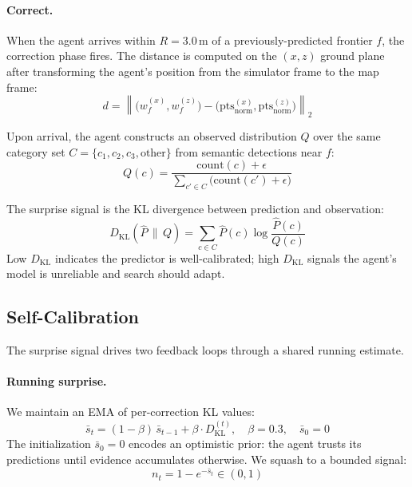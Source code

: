\paragraph{Correct.} When the agent arrives within $R = 3.0$\,m of a previously-predicted frontier $f$, the correction phase fires. The distance is computed on the $(x,z)$ ground plane after transforming the agent's position from the simulator frame to the map frame:
\begin{equation}
    d = \left\lVert \big(w_f^{(x)}, w_f^{(z)}\big) - \big(\mathrm{pts}_{\text{norm}}^{(x)}, \mathrm{pts}_{\text{norm}}^{(z)}\big) \right\rVert_2
    \label{eq:arrival}
\end{equation}

Upon arrival, the agent constructs an observed distribution $Q$ over the same category set $C = \{c_1, c_2, c_3, \text{other}\}$ from semantic detections near $f$:
\begin{equation}
    Q(c) = \frac{\mathrm{count}(c) + \epsilon}{\sum_{c' \in C} \big(\mathrm{count}(c') + \epsilon\big)}
    \label{eq:observed}
\end{equation}

The surprise signal is the KL divergence between prediction and observation:
\begin{equation}
    D_{\mathrm{KL}}(\hat{P} \,\|\, Q) = \sum_{c \in C} \hat{P}(c) \log \frac{\hat{P}(c)}{Q(c)}
    \label{eq:kl}
\end{equation}
Low $D_{\mathrm{KL}}$ indicates the predictor is well-calibrated; high $D_{\mathrm{KL}}$ signals the agent's model is unreliable and search should adapt.

\subsection{Self-Calibration}
\label{sec:calibration}

The surprise signal drives two feedback loops through a shared running estimate.

\paragraph{Running surprise.} We maintain an EMA of per-correction KL values:
\begin{equation}
    \bar{s}_t = (1 - \beta)\,\bar{s}_{t-1} + \beta \cdot D_{\mathrm{KL}}^{(t)}, \quad \beta = 0.3, \quad \bar{s}_0 = 0
    \label{eq:ema}
\end{equation}
The initialization $\bar{s}_0 = 0$ encodes an optimistic prior: the agent trusts its predictions until evidence accumulates otherwise. We squash to a bounded signal:
\begin{equation}
    n_t = 1 - e^{-\bar{s}_t} \in (0, 1)
    \label{eq:squash}
\end{equation}

